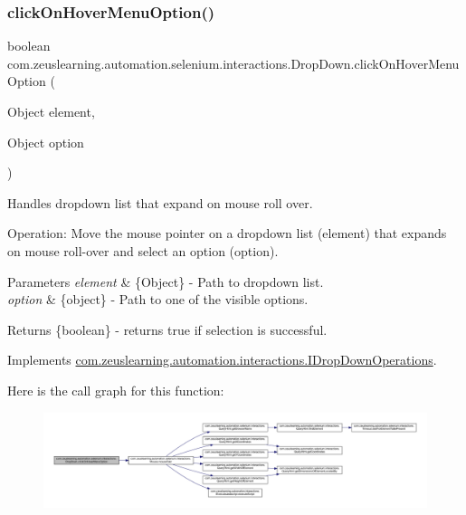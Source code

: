 \subsubsection{\texorpdfstring{click\+On\+Hover\+Menu\+Option()}{clickOnHoverMenuOption()}}
{\footnotesize\ttfamily boolean com.\+zeuslearning.\+automation.\+selenium.\+interactions.\+Drop\+Down.\+click\+On\+Hover\+Menu\+Option (\begin{DoxyParamCaption}\item[{Object}]{element,  }\item[{Object}]{option }\end{DoxyParamCaption})\hspace{0.3cm}{\ttfamily [inline]}}

Handles dropdown list that expand on mouse roll over.

Operation\+: Move the mouse pointer on a dropdown list (\textquotesingle{}element\textquotesingle{}) that expands on mouse roll-\/over and select an option ({\ttfamily option}). 


\begin{DoxyParams}{Parameters}
{\em element} & \{Object\} -\/ Path to dropdown list. \\
\hline
{\em option} & \{object\} -\/ Path to one of the visible options.\\
\hline
\end{DoxyParams}
\begin{DoxyReturn}{Returns}
\{boolean\} -\/ returns {\ttfamily true} if selection is successful. 
\end{DoxyReturn}


Implements \hyperlink{interfacecom_1_1zeuslearning_1_1automation_1_1interactions_1_1IDropDownOperations_add4d06e1de28d263d9451d67936c0324}{com.\+zeuslearning.\+automation.\+interactions.\+I\+Drop\+Down\+Operations}.

Here is the call graph for this function\+:
\nopagebreak
\begin{figure}[H]
\begin{center}
\leavevmode
\includegraphics[width=350pt]{d3/dcb/classcom_1_1zeuslearning_1_1automation_1_1selenium_1_1interactions_1_1DropDown_ab27460ee736614dfc1c93b57b98aadc2_cgraph}
\end{center}
\end{figure}
\hypertarget{classcom_1_1zeuslearning_1_1automation_1_1selenium_1_1interactions_1_1DropDown_aaf41adc5687eae5fd1980fa34b583a5f}{}\label{classcom_1_1zeuslearning_1_1automation_1_1selenium_1_1interactions_1_1DropDown_aaf41adc5687eae5fd1980fa34b583a5f} 
